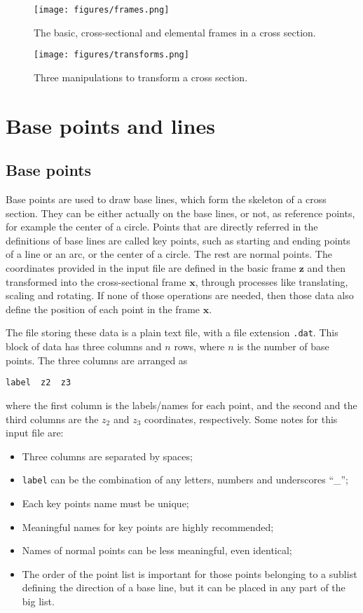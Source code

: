 \documentclass{book}
\begin{document}
\begin{figure}
  \centerline{\texttt{[image: figures/frames.png]}}
  \caption{The basic, cross-sectional and elemental frames in a cross section.}
  \label{fig:frames}
\end{figure}

\begin{figure}
  \centerline{\texttt{[image: figures/transforms.png]}}
  \caption{Three manipulations to transform a cross section.}
  \label{fig:transforms}
\end{figure}


\section{Base points and lines}
\label{sec:geometry}

\subsection{Base points}

Base points are used to draw base lines, which form the skeleton of a 
cross section. They can be either actually on the base lines, or not, 
as reference points, for example the center of a circle. Points that 
are directly referred in the definitions of base lines are called key points, 
such as starting and ending points of a line or an arc, or the center 
of a circle. The rest are normal points. The coordinates provided in the 
input file are defined in the basic frame $\mathbf z$ and then transformed 
into the cross-sectional frame $\mathbf x$, through processes like 
translating, scaling and rotating. If none of those operations are needed, 
then those data also define the position of each point in the frame $\mathbf x$.

The file storing these data is a plain text file, with a file extension 
\lstinline{.dat}. This block of data has three columns and $n$ rows, 
where $n$ is the number of base points. The three columns are arranged as

\lstinline{label  z2  z3}

where the first column is the labels/names for each point, and the second 
and the third columns are the $z_2$ and $z_3$ coordinates, respectively. 
Some notes for this input file are:

\begin{itemize}
  \item Three columns are separated by spaces;
  \item \lstinline{label} can be the combination of any letters, numbers 
    and underscores ``\_'';
  \item Each key points name must be unique;
  \item Meaningful names for key points are highly recommended;
  \item Names of normal points can be less meaningful, even identical;
  \item The order of the point list is important for those points 
    belonging to a sublist defining the direction of a base line, but 
    it can be placed in any part of the big list.
\end{itemize}
\end{document}
